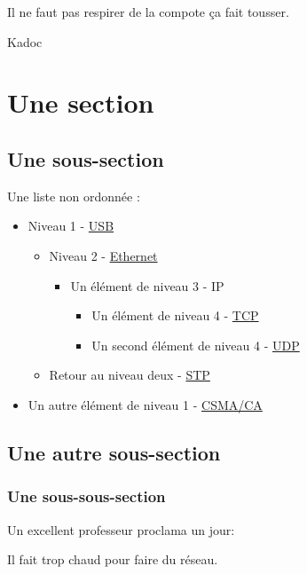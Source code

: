 \epigraph{Il ne faut pas respirer de la compote ça fait tousser.}{Kadoc}
\section{Une section}

\subsection{Une sous-section}

Une liste non ordonnée :
\begin{itemize}
    \item Niveau 1 - \href{https://fr.wikipedia.org/wiki/USB}{USB}
    \begin{itemize}
        \item Niveau 2 - \href{https://fr.wikipedia.org/wiki/Ethernet}{Ethernet}
        \begin{itemize}
            \item Un élément de niveau 3 - IP
            \begin{itemize}
                \item Un élément de niveau 4 - \href{https://en.wikipedia.org/wiki/TCP}{TCP}
                \item Un second élément de niveau 4 - \href{https://en.wikipedia.org/wiki/UDP}{UDP}
            \end{itemize}
        \end{itemize}
        \item Retour au niveau deux - \href{https://fr.wikipedia.org/wiki/Spanning_Tree_Protocol}{STP}
    \end{itemize}
    \item Un autre élément de niveau 1 - \href{https://fr.wikipedia.org/wiki/Carrier_Sense_Multiple_Access_with_Collision_Avoidance}{CSMA/CA}
\end{itemize}

\subsection{Une autre sous-section}
\subsubsection{Une sous-sous-section}
Un excellent professeur proclama un jour: 
\begin{center}
Il fait trop chaud pour faire du réseau.
\end{center}

